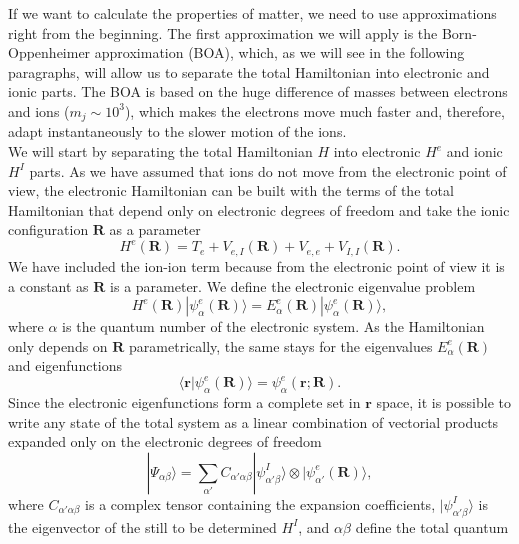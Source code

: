 If we want to calculate the properties of matter, we need to use approximations right from the beginning. The first approximation we will apply is the Born-Oppenheimer approximation (BOA), which, as we will see in the 
following paragraphs, will allow us to separate the total Hamiltonian into electronic and ionic parts. The BOA is based on the huge difference of masses between electrons and ions ($m_{j}\sim10^{3}$), which makes the 
electrons move much faster\cite{ashcroft1976solid} and, therefore, adapt instantaneously to the slower motion of the ions. \\

We will start by separating the total Hamiltonian $H$ into electronic $H^{e}$ and ionic $H^{I}$ parts. As we have assumed that ions do not move from the electronic point of view, the electronic Hamiltonian can be 
built with the terms of the total Hamiltonian that depend only on electronic degrees of freedom and take the ionic configuration $\mathbf{R}$ as a parameter
\begin{equation}
\label{electronic-harmiltonian}
H^{e}(\mathbf{R})=T_{e}+V_{e,I}(\mathbf{R})+V_{e,e}+V_{I,I}(\mathbf{R}).
\end{equation}
We have included the ion-ion term because from the electronic point of view it is a constant as $\mathbf{R}$ is a parameter. We define the electronic eigenvalue problem
\begin{equation}
 H^{e}(\mathbf{R})|\psi_{\alpha}^{e}(\mathbf{R})\rangle=E_{\alpha}^{e}(\mathbf{R})|\psi_{\alpha}^{e}(\mathbf{R})\rangle,
\end{equation}
where $\alpha$ is the quantum number of the electronic system. As the Hamiltonian only depends on $\mathbf{R}$ parametrically, the same stays for the eigenvalues $E_{\alpha}^{e}(\mathbf{R})$ and eigenfunctions
\begin{equation}
 \langle\mathbf{r}|\psi_{\alpha}^{e}(\mathbf{R})\rangle=\psi_{\alpha}^{e}(\mathbf{r};\mathbf{R}).
\end{equation}
Since the electronic eigenfunctions form a complete set in $\mathbf{r}$ space, it is possible to write any state of the total system as a linear combination of vectorial products expanded only on the electronic degrees of freedom
\begin{equation}
\label{totalvector}
 |\Psi_{\alpha\beta}\rangle=\sum_{\alpha'}C_{\alpha'\alpha\beta}|\psi_{\alpha'\beta}^{I}\rangle\otimes|\psi_{\alpha'}^{e}(\mathbf{R})\rangle,
\end{equation}
where $C_{\alpha'\alpha\beta}$ is a complex tensor containing the expansion coefficients, $|\psi_{\alpha'\beta}^{I}\rangle$ is the eigenvector of the still to be determined $H^{I}$, and $\alpha\beta$ define the total quantum 
